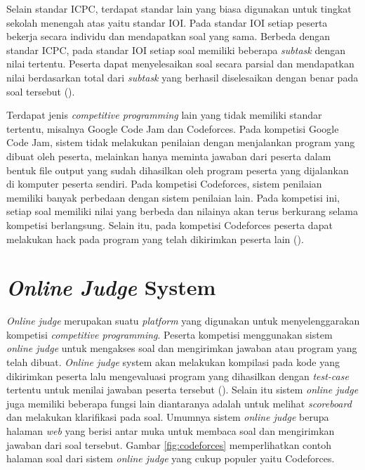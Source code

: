 \par Selain standar ICPC, terdapat standar lain yang biasa digunakan untuk tingkat sekolah menengah atas yaitu standar IOI. Pada standar IOI setiap peserta bekerja secara individu dan mendapatkan soal yang sama. Berbeda dengan standar ICPC, pada standar IOI setiap soal memiliki beberapa \textit{subtask} dengan nilai tertentu. Peserta dapat menyelesaikan soal secara parsial dan mendapatkan nilai berdasarkan total dari \textit{subtask} yang berhasil diselesaikan dengan benar pada soal tersebut (\cite{ioi2017}).
\par Terdapat jenis \textit{competitive programming} lain yang tidak memiliki standar tertentu, misalnya Google Code Jam dan Codeforces. Pada kompetisi Google Code Jam, sistem tidak melakukan penilaian dengan menjalankan program yang dibuat oleh peserta, melainkan hanya meminta jawaban dari peserta dalam bentuk file output yang sudah dihasilkan oleh program peserta yang dijalankan di komputer peserta sendiri. Pada kompetisi Codeforces, sistem penilaian memiliki banyak perbedaan dengan sistem penilaian lain. Pada kompetisi ini, setiap soal memiliki nilai yang berbeda dan nilainya akan terus berkurang selama kompetisi berlangsung. Selain itu, pada kompetisi Codeforces peserta dapat melakukan hack pada program yang telah dikirimkan peserta lain (\cite{cfrules}).

\section{\textit{Online Judge} System}

\par \textit{Online judge} merupakan suatu \textit{platform} yang digunakan untuk menyelenggarakan kompetisi \textit{competitive programming}. Peserta kompetisi menggunakan sistem \textit{online judge} untuk mengakses soal dan mengirimkan jawaban atau program yang telah dibuat. \textit{Online judge} system akan melakukan kompilasi pada kode yang dikirimkan peserta lalu mengevaluasi program yang dihasilkan dengan \textit{test-case} tertentu untuk menilai jawaban peserta tersebut (\cite{wasikojsurvey}). Selain itu sistem \textit{online judge} juga memiliki beberapa fungsi lain diantaranya adalah untuk melihat \textit{scoreboard} dan melakukan klarifikasi pada soal. Umumnya sistem \textit{online judge} berupa halaman \textit{web} yang berisi antar muka untuk membaca soal dan mengirimkan jawaban dari soal tersebut. Gambar \ref{fig:codeforces} memperlihatkan contoh halaman soal dari sistem \textit{online judge} yang cukup populer yaitu Codeforces.


